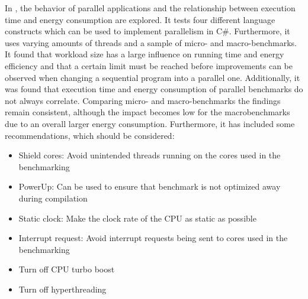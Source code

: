In \cite{Lindholt2022}, the behavior of parallel applications and the relationship between execution time and energy consumption are explored. It tests four different language constructs which can be used to implement parallelism in C\#. Furthermore, it uses varying amounts of threads and a sample of micro- and macro-benchmarks. It found that workload size has a large influence on running time and energy efficiency and that a certain limit must be reached before improvements can be observed when changing a sequential program into a parallel one. Additionally, it was found that execution time and energy consumption of parallel benchmarks do not always correlate. Comparing micro- and macro-benchmarks the findings remain consistent, although the impact becomes low for the macrobenchmarks due to an overall larger energy consumption. Furthermore, it has included some recommendations, which should be considered:\cite{Lindholt2022}

\begin{itemize}
    \item Shield cores: Avoid unintended threads running on the cores used in the benchmarking
    \item PowerUp: Can be used to ensure that benchmark is not optimized away during compilation
    \item Static clock: Make the clock rate of the CPU as static as possible
    \item Interrupt request: Avoid interrupt requests being sent to cores used in the benchmarking 
    \item Turn off CPU turbo boost
    \item Turn off hyperthreading
\end{itemize}